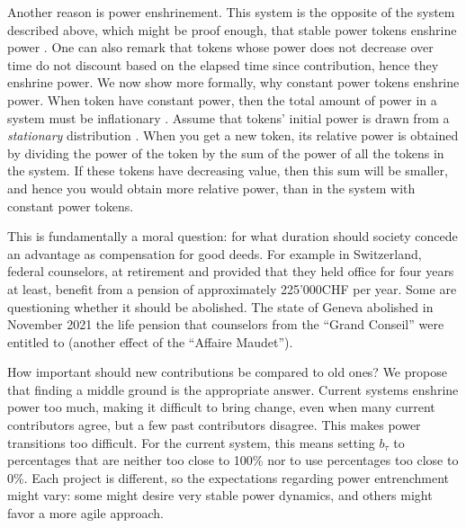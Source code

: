 Another reason is power enshrinement.
This system is the opposite of the system described above, which might be proof enough, that stable power tokens enshrine power%
.
One can also remark that tokens whose power does not decrease over time do not discount based on the elapsed time since contribution, hence they enshrine power.
We now show more formally, why constant power tokens enshrine power.
When token have constant power, then the total amount of power in a system must be inflationary%
.
Assume that tokens' initial power is drawn from a \emph{stationary} distribution%
.
When you get a new token, its relative power is obtained by dividing the power of the token by the sum of the power of all the tokens in the system.
If these tokens have decreasing value, then this sum will be smaller, and hence you would obtain more relative power, than in the system with constant power tokens.

This is fundamentally a moral question: for what duration should society concede an advantage as compensation for good deeds.
For example in Switzer\-land, federal counselors, at retirement and provided that they held office for four years at least, benefit from a pension of approximately 225'000CHF per year.
Some are questioning whether it should be abolished.
The state of Geneva abolished in November 2021 the life pension that counselors from the \enquote{Grand Conseil} were entitled to (another effect of the \enquote{Affaire Maudet}).

How important should new contributions be compared to old ones?
We propose that finding a middle ground is the appropriate answer.
Current systems enshrine power too much, making it difficult to bring change, even when many current contributors agree, but a few past contributors disagree.
This makes power transitions too difficult.
For the current system, this means setting $b_\tau$ to percentages that are neither too close to 100\% nor to use percentages too close to 0\%.
Each project is different, so the expectations regarding power entrenchment might vary: some might desire very stable power dynamics, and others might favor a more agile approach.

